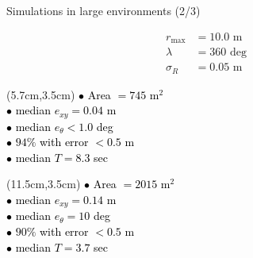 \begin{frame}[noframenumbering]{Simulations in large environments (2/3)}

  \begin{overlayarea}{\textwidth}{\textheight}
    \leavevmode
    \begin{minipage}{0.15\textwidth}\vspace{-2cm}
      \begin{align}
        r_{\max} &= 10.0 \text{ m} \nonumber \\
        \lambda &= 360 \text{ deg} \nonumber \\
        \sigma_R &= 0.05 \text{ m} \nonumber
      \end{align}
    \end{minipage}%
      \begin{minipage}{.85\textwidth}
      \begin{figure}
        \centering
        \begin{subfigure}{0.45\textwidth}
          \centering
          
        \end{subfigure}%
        \begin{subfigure}{0.45\textwidth}\hspace{-0.2cm}
          
        \end{subfigure}
      \end{figure}
    \end{minipage}


    \begin{textblock*}{5cm}(5.7cm,3.5cm) %
      \textcolor{black}{$\bullet$ Area $ = 745$ m$^2$ \\
                        $\bullet$ median $e_{xy} = 0.04$ m \\
                        $\bullet$ median $e_{\theta} < 1.0$ deg \\
                        $\bullet$ $94\%$ with error $< 0.5$ m \\
                        $\bullet$ median $T = 8.3$ sec}
    \end{textblock*}

    \begin{textblock*}{5cm}(11.5cm,3.5cm) %
      \textcolor{black}{$\bullet$ Area $ = 2015$ m$^2$ \\
                        $\bullet$ median $e_{xy} = 0.14$ m \\
                        $\bullet$ median $e_{\theta} = 10$ deg\\
                        $\bullet$ $90 \%$ with error $< 0.5$ m \\
                        $\bullet$ median $T = 3.7$ sec}
    \end{textblock*}

  \end{overlayarea}

\end{frame}
